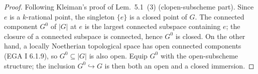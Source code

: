 %
%
%
\begin{proof}
  Following Kleiman's proof of Lem.~5.1~(3) (clopen-subscheme part).
  Since \(e\) is a \(k\)-rational point, the singleton \(\{e\}\) is a closed
  point of \(G\). The connected component \(G^0\) of \(|G|\) at \(e\) is the
  largest connected subspace containing \(e\); the closure of a connected
  subspace is connected, hence \(G^0\) is closed. On the other hand, a
  locally Noetherian topological space has open connected components
  (EGA I 6.1.9), so \(G^0 \subseteq |G|\) is also open. Equip \(G^0\) with
  the open-subscheme structure; the inclusion
  \(G^0 \hookrightarrow G\) is then both an open and a closed immersion.
\end{proof}

